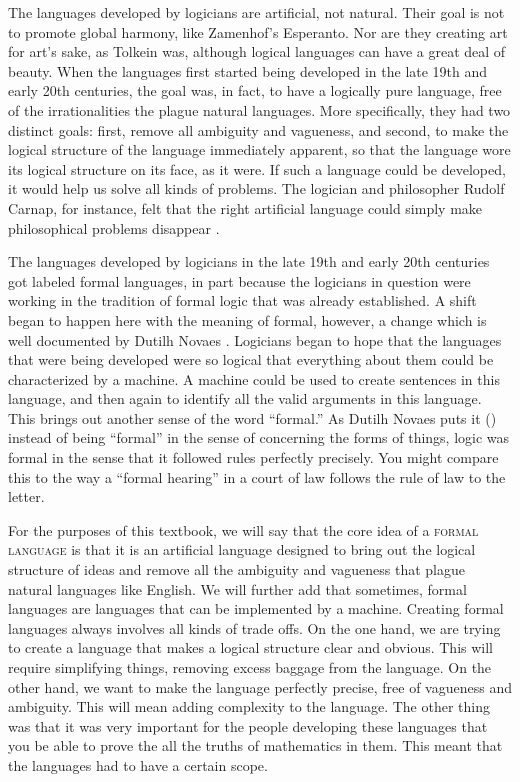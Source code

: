 The languages developed by logicians are artificial, not natural. Their goal is not to promote global harmony, like Zamenhof's Esperanto. Nor are they creating art for art's sake, as Tolkein was, although logical languages can have a great deal of beauty. When the languages first started being developed in the late 19th and early 20th centuries, the goal was, in fact, to have a logically pure language, free of the irrationalities the plague natural languages. More specifically, they had two distinct goals: first, remove all ambiguity and vagueness, and second, to make the logical structure of the language immediately apparent, so that the language wore its logical structure on its face, as it were. If such a language could be developed, it would help us solve all kinds of problems. The logician and philosopher Rudolf Carnap, for instance, felt that the right artificial language could simply make philosophical problems disappear \citep{Carnap1928}.

The languages developed by logicians in the late 19th and early 20th centuries got labeled formal languages, in part because the logicians in question were working in the tradition of formal logic that was already established. A shift began to happen here with the meaning of formal, however, a change which is well documented by Dutilh Novaes  \citeyear{DutilhNovaes2011}. Logicians began to hope that the languages that were being developed were so logical that everything about them could be characterized by a machine. A machine could be used to create sentences in this language, and then again to identify all the valid arguments in this language. This brings out another sense of the word ``formal.'' As Dutilh Novaes puts it (\citeyear{DutilhNovaes2011}) instead of being ``formal'' in the sense of concerning the forms of things, logic was formal in the sense that it followed rules perfectly precisely. You might compare this to the way a ``formal hearing'' in a court of law follows the rule of law to the letter. 

For the purposes of this textbook, we will say that the core idea of a  \textsc{\gls{formal language}} \label{def:formal_language} is that it is an artificial language designed to bring out the logical structure of ideas and remove all the ambiguity and vagueness that plague natural languages like English. We will further add that sometimes, formal languages are languages that can be implemented by a machine. Creating formal languages always involves all kinds of trade offs. On the one hand, we are trying to create a language that makes a logical structure clear and obvious. This will require simplifying things, removing excess baggage from the language. On the other hand, we want to make the language perfectly precise, free of vagueness and ambiguity. This will mean adding complexity to the language. The other thing was that it was very important for the people developing these languages that you be able to prove the all the truths of mathematics in them. This meant that the languages had to have a certain scope.


